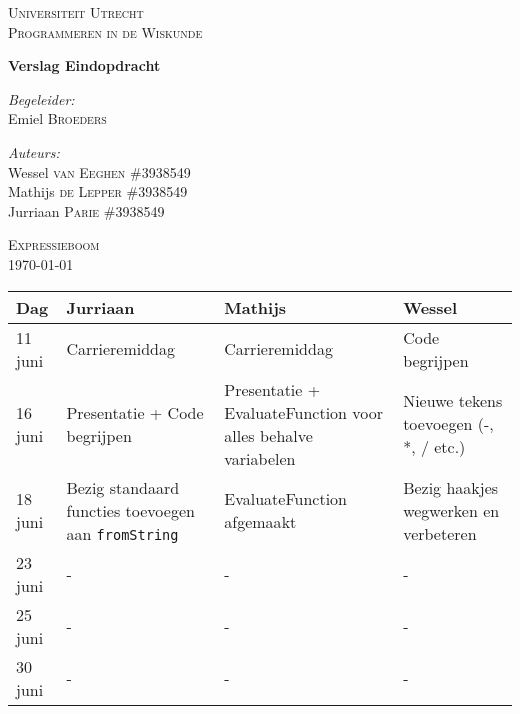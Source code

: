 \documentclass[12pt]{article}
\begin{document}
\begin{titlepage}
\begin{center}

\textsc{\LARGE Universiteit Utrecht}\\[1.6cm]

\textsc{\Large Programmeren in de Wiskunde}\vspace{2pc}

{\huge \bfseries Verslag Eindopdracht}
\vspace{3pc}

\begin{minipage}{0.7\textwidth}
\begin{flushleft} \large
\emph{Begeleider:} \\
Emiel \textsc{Broeders} 
\end{flushleft}
\begin{flushleft} \large
\emph{Auteurs:}\\
Wessel \textsc{van Eeghen} \tab\#3938549\\
Mathijs \textsc{de Lepper}  \tab\#3938549\\
Jurriaan \textsc{Parie}  \tab\tab\#3938549
\end{flushleft}
\end{minipage}
\begin{minipage}{0.4\textwidth}
\end{minipage}
\vspace{10pc} 

\textsc{\Large Expressieboom}\\[4.0cm]
{\large \today}
\end{center}
\end{titlepage}
\newpage

\begin{center}
    \begin{tabular}{ | l | p{4cm}  | p{4cm} | p{4cm} |}
    \hline
    Dag & Jurriaan & Mathijs & Wessel \\ \hline
    11 juni & Carrieremiddag & Carrieremiddag & Code begrijpen \\ \hline
    16 juni & Presentatie + Code begrijpen & Presentatie + EvaluateFunction voor alles behalve variabelen & Nieuwe tekens toevoegen (-, *, / etc.) \\ \hline
    18 juni & Bezig standaard functies toevoegen aan \texttt{fromString} & EvaluateFunction afgemaakt & Bezig haakjes wegwerken en verbeteren \\ \hline
    23 juni & - & - & - \\ \hline
    25 juni & - & - & - \\ \hline
    30 juni & - & - & - \\
    \hline
    \end{tabular}
\end{center}
\end{document}
